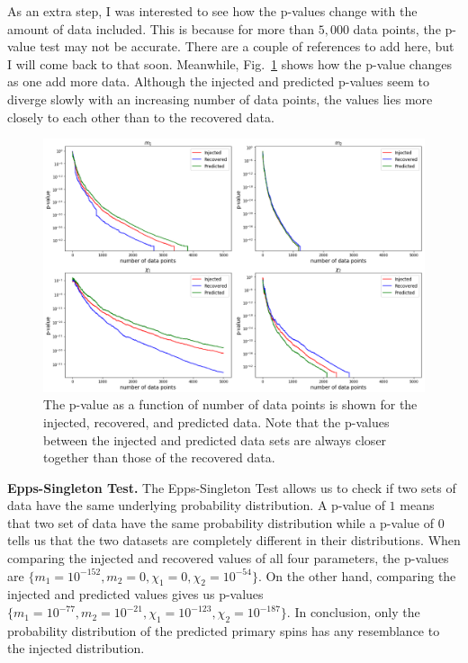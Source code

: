 \documentclass[aps,prd,twocolumn,superscriptaddress,preprintnumbers,floatfix,nofootinbib]{revtex4-2}
\begin{document}
As an extra step, I was interested to see how the p-values change with the amount of data 
included. This is because for more than $5,000$ data points, the p-value test may not be 
accurate. There are a couple of references to add here, but I will come back to that soon. 
Meanwhile, Fig.~\ref{m_chi_SW_test} shows how the p-value changes as one add more data. 
Although the injected and predicted p-values seem to diverge slowly with an increasing 
number of data points, the values lies more closely to each other than to the
recovered data.
\begin{figure}[h]
  \centering
  \includegraphics[width=\linewidth]{m_chi_SW_test.png}
  \caption{The p-value as a function of number of data points is shown for the injected, 
  		recovered, and predicted data. Note that the p-values between the injected and 
		predicted data sets are always closer together than those of the recovered data.}
  \label{m_chi_SW_test}
\end{figure}

\textbf{Epps-Singleton Test.} The Epps-Singleton Test allows us to check if two 
sets of data have the same underlying probability distribution. A p-value of $1$ means 
that two set of data have the same probability distribution while a p-value of $0$ tells us 
that the two datasets are completely different in their distributions. When comparing the 
injected and recovered values of all four parameters, the p-values are 
$\{m_1=10^{-152}, m_2=0, \chi_1=0, \chi_2=10^{-54}\}$. On the other hand, comparing 
the injected and predicted values gives us p-values 
$\{m_1=10^{-77}, m_2=10^{-21}, \chi_1=10^{-123}, \chi_2=10^{-187}\}$. In
conclusion, only the probability distribution of the predicted primary spins
has any resemblance to the injected distribution.
\end{document}
